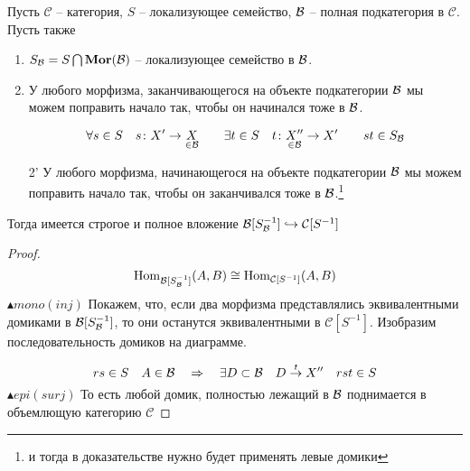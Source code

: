 \documentclass[../main.tex]{subfiles}
\begin{document}
\begin{to_lem}
\label{AB}
Пусть $\mathcal{C}$ -- категория, $S$ -- локализующее семейство, $\mathcal{B}$ -- полная подкатегория в $\mathcal{C}$.  Пусть также 
\begin{enumerate}
    \item $S_{\mathcal{B}} = S \bigcap \mathbf{Mor}(\mathcal{B})$ -- локализующее семейство в $\mathcal{B}$.
    \item У любого морфизма, заканчивающегося на объекте подкатегории $\mathcal{B}$ мы можем поправить начало так, чтобы он начинался тоже в $\mathcal{B}$.
    \bee
    \eee
    \[\forall s \in S \quad s \colon X' \to \underset{\in \mathcal{B}}{X} \qquad \exists t \in S \quad t \colon \underset{\in \mathcal{B}}{X''} \to X' \qquad st \in S_{\mathcal{B}}\]
    \item[2'] У любого морфизма, начинающегося на объекте подкатегории $\mathcal{B}$ мы можем поправить начало так, чтобы он заканчивался тоже в $\mathcal{B}$.\footnote{и тогда в доказательстве нужно будет применять левые домики}
    \bee
    \eee
\end{enumerate}
Тогда имеется строгое и полное вложение $\mathcal{B}[S_{\mathcal{B}}^{-1}] \hookrightarrow \mathcal{C}[S^{-1}]$
\end{to_lem}
\begin{proof}
    \[\operatorname{Hom}_{\mathcal{B}[S_{\mathcal{B}}^{-1}]} (A, B) \cong \operatorname{Hom}_{\mathcal{C}[S^{-1}]}(A, B) \]
    $\blacktriangle mono(inj)$ Покажем, что, если два морфизма представлялись эквивалентными домиками в $\mathcal{B}[S_{\mathcal{B}}^{-1}]$, то они останутся эквивалентными в $\mathcal{C}[S^{-1}]$. Изобразим последовательность домиков на диаграмме.
    \bee
    \eee
    \[rs \in S \quad A \in \mathcal{B} \quad \Rightarrow \quad \exists D \subset \mathcal{B} \quad D \overset{t}{\to}X'' \quad rst \in S \]
    $\blacktriangle epi(surj)$ То есть любой домик, полностью лежащий в $\mathcal{B}$ поднимается в объемлющую категорию $\mathcal{C}$
    \bee
    \eee
\end{proof}
\end{document}
